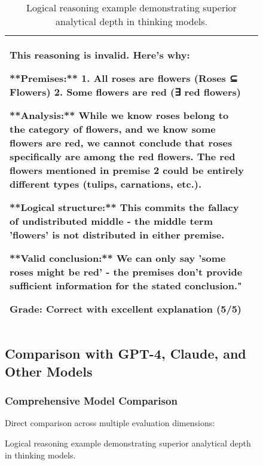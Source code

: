 \begin{table}[H]
\begin{figure}[H]
\begin{table}[H]
\begin{tabular}{p{}|p{}}
This reasoning is \textbf{invalid}. Here's why:

**Premises:**
1. All roses are flowers (Roses ⊆ Flowers)
2. Some flowers are red (∃ red flowers)

**Analysis:** While we know roses belong to the category of flowers, and we know some flowers are red, we cannot conclude that roses specifically are among the red flowers. The red flowers mentioned in premise 2 could be entirely different types (tulips, carnations, etc.).

**Logical structure:** This commits the fallacy of undistributed middle - the middle term 'flowers' is not distributed in either premise.

**Valid conclusion:** We can only say 'some roses might be red' - the premises don't provide sufficient information for the stated conclusion."

\textbf{Grade: Correct with excellent explanation (5/5)}
\\
\bottomrule
\end{tabular}
\caption{Logical reasoning example demonstrating superior analytical depth in thinking models.}
\label{tab:logic-example}
\end{table}

\subsection{Comparison with GPT-4, Claude, and Other Models}

\subsubsection{Comprehensive Model Comparison}

Direct comparison across multiple evaluation dimensions:


\end{figure}
\end{table}
